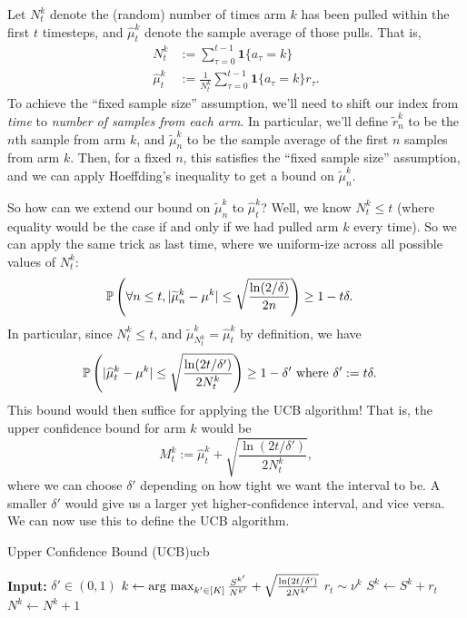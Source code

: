 \documentclass[\main/main]{subfiles}
\begin{document}
Let $N^k_t$ denote the (random) number of times arm $k$ has been pulled within the first $t$ timesteps, and $\hat \mu^k_t$ denote the sample average of those pulls. That is,
\begin{align*}
    N^k_t        & := \sum_{\tau=0}^{t-1} \mathbf{1} \{ a_\tau = k \}                         \\
    \hat \mu^k_t & := \frac{1}{N^k_t} \sum_{\tau=0}^{t-1} \mathbf{1} \{ a_\tau = k \} r_\tau.
\end{align*}
To achieve the ``fixed sample size'' assumption, we'll need to shift our index from \emph{time} to \emph{number of samples from each arm}. In particular, we'll define $\tilde r^k_n$ to be the $n$th sample from arm $k$, and $\tilde \mu^k_n$ to be the sample average of the first $n$ samples from arm $k$. Then, for a fixed $n$, this satisfies the ``fixed sample size'' assumption, and we can apply Hoeffding's inequality to get a bound on $\tilde \mu^k_n$.

So how can we extend our bound on $\tilde\mu^k_n$ to $\hat \mu^k_t$? Well, we know $N^k_t \le t$ (where equality would be the case if and only if we had pulled arm $k$ every time). So we can apply the same trick as last time, where we uniform-ize across all possible values of $N^k_t$:
\begin{align*}
    \P\left( \forall n \le t, |\tilde \mu^k_n - \mu^k | \le \sqrt{\frac{\ln(2/\delta)}{2n}} \right) & \ge 1-t\delta.
\end{align*}
In particular, since $N^k_t \le t$, and $\tilde \mu^k_{N^k_t} = \hat \mu^k_t$ by definition, we have
\begin{align*}
    \P\left( |\hat \mu^k_t - \mu^k | \le \sqrt{\frac{\ln(2t/\delta')}{2N^k_t}} \right) & \ge 1-\delta' \text{ where } \delta' := t \delta.
\end{align*}
This bound would then suffice for applying the UCB algorithm! That is, the upper confidence bound for arm $k$ would be \[ M^k_t := \hat \mu^k_t + \sqrt{\frac{\ln(2t/\delta')}{2N^k_t}}, \] where we can choose $\delta'$ depending on how tight we want the interval to be. A smaller $\delta'$ would give us a larger yet higher-confidence interval, and vice versa. We can now use this to define the UCB algorithm.

\begin{definition}{Upper Confidence Bound (UCB)}{ucb}
    \begin{algorithmic}
        \State \textbf{Input:} $\delta' \in (0, 1)$
        \State $k \gets \argmax_{k' \in [K]} \frac{S^{k'}}{N^{k'}} + \sqrt{\frac{\ln(2t/\delta')}{2 N^{k'}}}$
        \State $r_t \sim \nu^k$
        \State $S^k \gets S^k + r_t$
        \State $N^k \gets N^k + 1$
        \EndFor
    \end{algorithmic}
\end{definition}
\end{document}
